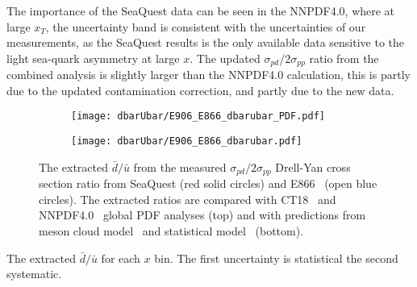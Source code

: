 \documentclass[../main.tex]{subfiles}
\begin{document}
The importance of the SeaQuest data can be seen in the NNPDF4.0, where at large $x_T$, the
uncertainty band is consistent with the uncertainties of our measurements, as the SeaQuest
results is the only available data sensitive to the light sea-quark asymmetry at large $x$.
The updated $\sigma_{pd}/2\sigma_{pp}$ ratio from the combined analysis is slightly larger than the NNPDF4.0
calculation, this is partly due to the updated contamination correction, and partly due to the new data.
\begin{figure}[htpb!]
	\centering
	\begin{subfigure}{0.55\linewidth}
		\texttt{[image: dbarUbar/E906\_E866\_dbarubar\_PDF.pdf]}
	\end{subfigure}
	\begin{subfigure}{0.55\linewidth}
		\texttt{[image: dbarUbar/E906\_E866\_dbarubar.pdf]}
	\end{subfigure}
	\caption{The extracted $\bar{d}/\bar{u}$ from the measured $\sigma_{pd}/2\sigma_{pp}$ Drell-Yan cross section ratio
		from SeaQuest (red solid circles) and E866~\cite{towell2001} (open blue circles).
		The extracted ratios are compared with CT18~\cite{hou2021} and NNPDF4.0~\cite{ball2022a} global PDF analyses (top)
		and with predictions from meson cloud model~\cite{alberg2022} and statistical model~\cite{soffer2019} (bottom).}
	\label{fig:e906_e866_dbarubar}
\end{figure}
\begin{table}[htpb!]
	\centering
	\caption{The extracted $\bar{d}/\bar{u}$ for each $x$ bin. The first uncertainty is statistical the second systematic.}
	\label{tab:dbarubar_e906}
	
\end{table}
\end{document}

